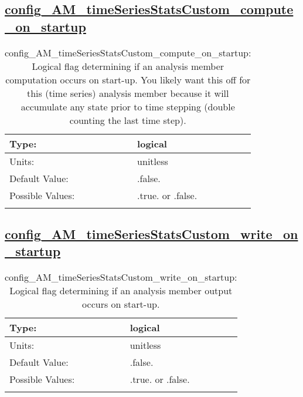 \subsection[config\_AM\_timeSeriesStatsCustom\_compute\_on\_startup]{\hyperref[sec:nm_tab_AM_timeSeriesStatsCustom]{config\_AM\_timeSeriesStatsCustom\_compute\_on\_startup}}
\label{subsec:nm_sec_config_AM_timeSeriesStatsCustom_compute_on_startup}
\begin{center}
\begin{longtable}{| p{2.0in} || p{4.0in} |}
    \hline
    Type: & logical \\
    \hline
    Units: & \si{unitless} \\
    \hline
    Default Value: & .false. \\
    \hline
    Possible Values: & .true. or .false. \\
    \hline
    \caption{config\_AM\_timeSeriesStatsCustom\_compute\_on\_startup: Logical flag determining if an analysis member computation occurs on start-up. You likely want this off for this (time series) analysis member because it will accumulate any state prior to time stepping (double counting the last time step).}
\end{longtable}
\end{center}
\subsection[config\_AM\_timeSeriesStatsCustom\_write\_on\_startup]{\hyperref[sec:nm_tab_AM_timeSeriesStatsCustom]{config\_AM\_timeSeriesStatsCustom\_write\_on\_startup}}
\label{subsec:nm_sec_config_AM_timeSeriesStatsCustom_write_on_startup}
\begin{center}
\begin{longtable}{| p{2.0in} || p{4.0in} |}
    \hline
    Type: & logical \\
    \hline
    Units: & \si{unitless} \\
    \hline
    Default Value: & .false. \\
    \hline
    Possible Values: & .true. or .false. \\
    \hline
    \caption{config\_AM\_timeSeriesStatsCustom\_write\_on\_startup: Logical flag determining if an analysis member output occurs on start-up.}
\end{longtable}
\end{center}
